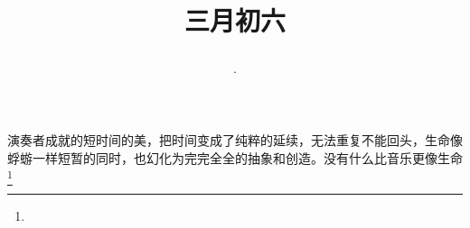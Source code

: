 \title{\date[d=14,m=4,y=2024][year:cn-y,年,month:cn,day:cn,日,·,weekday]·三月初六 }
演奏者成就的短时间的美，把时间变成了纯粹的延续，无法重复不能回头，生命像蜉蝣一样短暂的同时，也幻化为完完全全的抽象和创造。没有什么比音乐更像生命\footnote{ }

